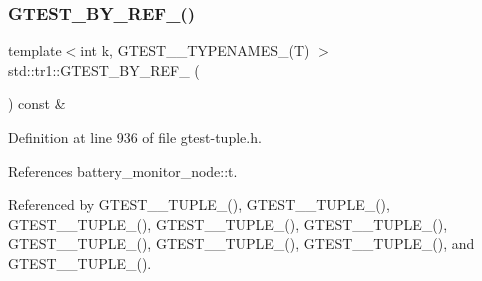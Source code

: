 \subsubsection{\texorpdfstring{G\+T\+E\+S\+T\+\_\+\+B\+Y\+\_\+\+R\+E\+F\+\_\+()}{GTEST\_BY\_REF\_()}}
{\footnotesize\ttfamily template$<$int k, G\+T\+E\+S\+T\+\_\+\_\+\+T\+Y\+P\+E\+N\+A\+M\+E\+S\+\_\+(\+T) $>$ \\
std\+::tr1\+::\+G\+T\+E\+S\+T\+\_\+\+B\+Y\+\_\+\+R\+E\+F\+\_\+ (\begin{DoxyParamCaption}\item[{\hyperlink{gtest-tuple_8h_a1b7f133d8aa02e0b7afed7b66781eeb7}{G\+T\+E\+S\+T\+\_\+\+T\+U\+P\+L\+E\+\_\+\+E\+L\+E\+M\+E\+N\+T\+\_\+}(k, \hyperlink{namespacestd_1_1tr1_aa636d3269bf1f368a7bc09ff158bc482}{G\+T\+E\+S\+T\+\_\+10\+\_\+\+T\+U\+P\+L\+E\+\_\+}(T))}]{ }\end{DoxyParamCaption}) const \&}



Definition at line 936 of file gtest-\/tuple.\+h.



References battery\+\_\+monitor\+\_\+node\+::t.



Referenced by G\+T\+E\+S\+T\+\_\+\_\+\+T\+U\+P\+L\+E\+\_\+(), G\+T\+E\+S\+T\+\_\+\_\+\+T\+U\+P\+L\+E\+\_\+(), G\+T\+E\+S\+T\+\_\+\_\+\+T\+U\+P\+L\+E\+\_\+(), G\+T\+E\+S\+T\+\_\+\_\+\+T\+U\+P\+L\+E\+\_\+(), G\+T\+E\+S\+T\+\_\+\_\+\+T\+U\+P\+L\+E\+\_\+(), G\+T\+E\+S\+T\+\_\+\_\+\+T\+U\+P\+L\+E\+\_\+(), G\+T\+E\+S\+T\+\_\+\_\+\+T\+U\+P\+L\+E\+\_\+(), G\+T\+E\+S\+T\+\_\+\_\+\+T\+U\+P\+L\+E\+\_\+(), and G\+T\+E\+S\+T\+\_\+\_\+\+T\+U\+P\+L\+E\+\_\+().


